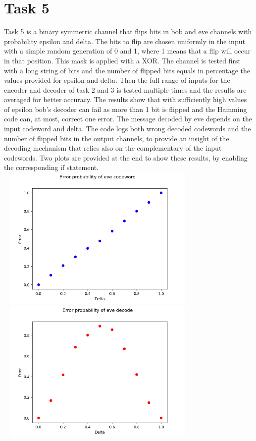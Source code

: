 \documentclass{report}
\begin{document}
\section*{Task 5}
Task 5 is a binary symmetric channel that flips bits in bob and eve channels with probability epsilon and delta. The bits to flip are chosen uniformly in the input with a simple random generation of 0 and 1, where 1 means that a flip will occur in that position. This mask is applied with a XOR.
The channel is tested first with a long string of bits and the number of flipped bits equals in percentage the values provided for epsilon and delta.
Then the full range of inputs for the encoder and decoder of task 2 and 3 is tested multiple times and the results are averaged for better accuracy.
The results show that with sufficiently high values of epsilon bob's decoder can fail as more than 1 bit is flipped and the Hamming code can, at most, correct one error. The message decoded by eve depends on the input codeword and delta.
The code logs both wrong decoded codewords and the number of flipped bits in the output channels, to provide an insight of the decoding mechanism that relies also on the complementary of the input codewords.
Two plots are provided at the end to show these results, by enabling the corresponding if statement. \hfill \break \linebreak
 \includegraphics[width=10cm,height=7cm]{5}
  \includegraphics[width=10cm,height=7cm]{6}
\end{document}
